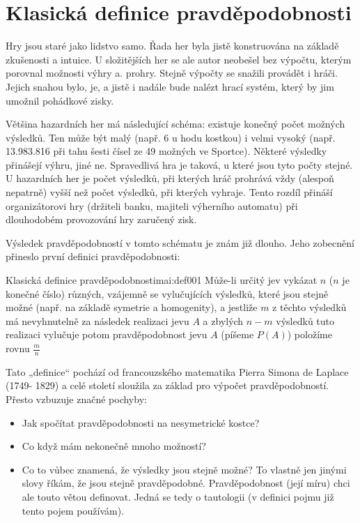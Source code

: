     
  
  \section{Klasická definice pravděpodobnosti}
    Hry jsou staré jako lidstvo samo. Řada her byla jistě konstruována na základě zkušenosti a
    intuice. U složitějších her se ale autor neobešel bez výpočtu, kterým porovnal možnosti výhry a.
    prohry. Stejně výpočty se snažili provádět i hráči. Jejich snahou bylo, je, a jistě i nadále
    bude nalézt hrací systém, který by jim umožnil pohádkové zisky.
    
    Většina hazardních her má následující schéma: existuje konečný počet možných výsledků. Ten může
    být malý (např. 6 u hodu kostkou) i velmi vysoký (např. 13.983.816 při tahu šesti čísel ze 49
    možných ve Sportce). Některé výsledky přinášejí výhru, jiné ne. Spravedlivá hra je taková, u
    které jsou tyto počty stejné. U hazardních her je počet výsledků, při kterých hráč prohrává vždy
    (alespoň nepatrně) vyšší než počet výsledků, při kterých vyhraje. Tento rozdíl přináší
    organizátorovi hry (držiteli banku, majiteli výherního automatu) při dlouhodobém provozování hry
    zaručený zisk.
    
    Výsledek pravděpodobností v tomto schématu je znám již dlouho. Jeho zobecnění přineslo první
    deﬁnici pravděpodobnosti:
    \begin{mathdef}{Klasická definice pravděpodobnosti}{mai:def001}
      Může-li určitý jev vykázat \(n\) (\(n\) je konečné číslo) různých, vzájemně se vylučujících
      výsledků, které jsou stejně možné (např. na základě symetrie a homogenity), a jestliže \(m\) z
      těchto výsledků má nevyhnutelně za následek realizaci jevu \(A\) a zbylých \(n - m\) výsledků
      tuto realizaci vylučuje potom pravděpodobnost jevu \(A\) (píšeme \(P(A)\)) položíme rovnu
      \(\frac{m}{n}\)
    \end{mathdef}

    Tato „deﬁnice“ pochází od francouzského matematika Pierra Simona de Laplace (1749- 1829) a celé
    století sloužila za základ pro výpočet pravděpodobností. Přesto vzbuzuje značné pochyby:

    \begin{itemize}[noitemsep]
      \item Jak spočítat pravděpodobnosti na nesymetrické kostce?
      \item Co když mám nekonečně mnoho možností? 
      \item Co to vůbec znamená, že výsledky jsou stejně možné? To vlastně jen jinými slovy říkám,
            že jsou stejně pravděpodobné. Pravděpodobnost (její míru) chci ale touto větou deﬁnovat.
            Jedná se tedy o tautologii (v deﬁnici pojmu již tento pojem používám).
    \end{itemize}
    
